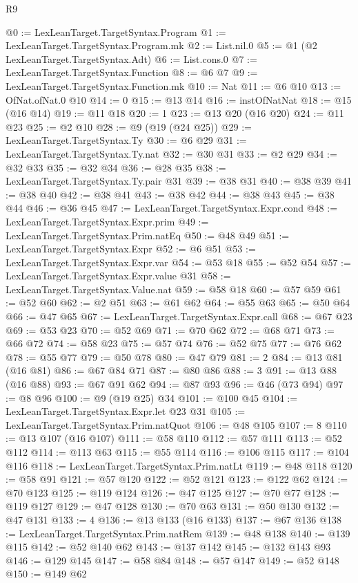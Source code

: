 \begin{lexlean}{R9}
\begin{coremodule}
@0 := LexLeanTarget.TargetSyntax.Program
@1 := LexLeanTarget.TargetSyntax.Program.mk
@2 := List.nil.{0}
@5 := @1 (@2 LexLeanTarget.TargetSyntax.Adt)
@6 := List.cons.{0}
@7 := LexLeanTarget.TargetSyntax.Function
@8 := @6 @7
@9 := LexLeanTarget.TargetSyntax.Function.mk
@10 := Nat
@11 := @6 @10
@13 := OfNat.ofNat.{0} @10
@14 := 0
@15 := @13 @14
@16 := instOfNatNat
@18 := @15 (@16 @14)
@19 := @11 @18
@20 := 1
@23 := @13 @20 (@16 @20)
@24 := @11 @23
@25 := @2 @10
@28 := @9 (@19 (@24 @25))
@29 := LexLeanTarget.TargetSyntax.Ty
@30 := @6 @29
@31 := LexLeanTarget.TargetSyntax.Ty.nat
@32 := @30 @31
@33 := @2 @29
@34 := @32 @33
@35 := @32 @34
@36 := @28 @35
@38 := LexLeanTarget.TargetSyntax.Ty.pair @31
@39 := @38 @31
@40 := @38 @39
@41 := @38 @40
@42 := @38 @41
@43 := @38 @42
@44 := @38 @43
@45 := @38 @44
@46 := @36 @45
@47 := LexLeanTarget.TargetSyntax.Expr.cond
@48 := LexLeanTarget.TargetSyntax.Expr.prim
@49 := LexLeanTarget.TargetSyntax.Prim.natEq
@50 := @48 @49
@51 := LexLeanTarget.TargetSyntax.Expr
@52 := @6 @51
@53 := LexLeanTarget.TargetSyntax.Expr.var
@54 := @53 @18
@55 := @52 @54
@57 := LexLeanTarget.TargetSyntax.Expr.value @31
@58 := LexLeanTarget.TargetSyntax.Value.nat
@59 := @58 @18
@60 := @57 @59
@61 := @52 @60
@62 := @2 @51
@63 := @61 @62
@64 := @55 @63
@65 := @50 @64
@66 := @47 @65
@67 := LexLeanTarget.TargetSyntax.Expr.call
@68 := @67 @23
@69 := @53 @23
@70 := @52 @69
@71 := @70 @62
@72 := @68 @71
@73 := @66 @72
@74 := @58 @23
@75 := @57 @74
@76 := @52 @75
@77 := @76 @62
@78 := @55 @77
@79 := @50 @78
@80 := @47 @79
@81 := 2
@84 := @13 @81 (@16 @81)
@86 := @67 @84 @71
@87 := @80 @86
@88 := 3
@91 := @13 @88 (@16 @88)
@93 := @67 @91 @62
@94 := @87 @93
@96 := @46 (@73 @94)
@97 := @8 @96
@100 := @9 (@19 @25) @34
@101 := @100 @45
@104 := LexLeanTarget.TargetSyntax.Expr.let @23 @31
@105 := LexLeanTarget.TargetSyntax.Prim.natQuot
@106 := @48 @105
@107 := 8
@110 := @13 @107 (@16 @107)
@111 := @58 @110
@112 := @57 @111
@113 := @52 @112
@114 := @113 @63
@115 := @55 @114
@116 := @106 @115
@117 := @104 @116
@118 := LexLeanTarget.TargetSyntax.Prim.natLt
@119 := @48 @118
@120 := @58 @91
@121 := @57 @120
@122 := @52 @121
@123 := @122 @62
@124 := @70 @123
@125 := @119 @124
@126 := @47 @125
@127 := @70 @77
@128 := @119 @127
@129 := @47 @128
@130 := @70 @63
@131 := @50 @130
@132 := @47 @131
@133 := 4
@136 := @13 @133 (@16 @133)
@137 := @67 @136
@138 := LexLeanTarget.TargetSyntax.Prim.natRem
@139 := @48 @138
@140 := @139 @115
@142 := @52 @140 @62
@143 := @137 @142
@145 := @132 @143 @93
@146 := @129 @145
@147 := @58 @84
@148 := @57 @147
@149 := @52 @148
@150 := @149 @62

\end{coremodule}
\end{lexlean}
